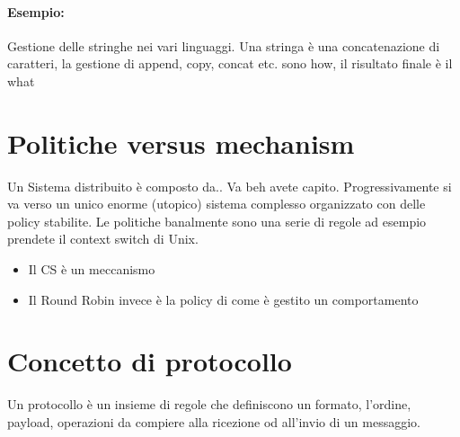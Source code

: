 \documentclass[12pt, a4paper, openany, twoside]{book}
\begin{document}
\paragraph{Esempio:}
Gestione delle stringhe nei vari linguaggi. Una stringa è una concatenazione
di caratteri, la gestione di append, copy, concat etc. sono how, il 
risultato finale è il what
\section{Politiche versus mechanism}
Un Sistema distribuito è composto da.. Va beh avete capito. Progressivamente
si va verso un unico enorme (utopico) sistema complesso organizzato con delle
policy stabilite. 
Le politiche banalmente sono una serie di regole ad esempio prendete il context
switch di Unix. 
\begin{itemize}
	\item Il CS è un meccanismo
	\item Il Round Robin invece è la policy di come è gestito un comportamento	
\end{itemize}
\section{Concetto di protocollo}
Un protocollo è un insieme di regole che definiscono un formato, l'ordine,
payload, operazioni da compiere alla ricezione od all'invio di un 
messaggio.


    
\end{document}
